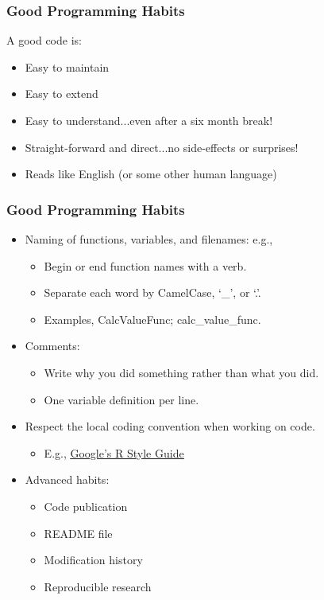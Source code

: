 \documentclass[aspectratio=169, 12pt]{beamer}
\begin{document}
	\begin{frame}
	\frametitle{Good Programming Habits}
	A good code is:
	\begin{itemize}
	\item Easy to maintain
	\item Easy to extend
	\item Easy to understand...even after a six month break!
	\item Straight-forward and direct...no side-effects or surprises!
	\item Reads like English (or some other human language)
	\end{itemize}

	\end{frame}

	\begin{frame}
	\frametitle{Good Programming Habits}
	\begin{itemize}
	\item Naming of functions, variables, and filenames: e.g., 
	\begin{itemize}
	\item Begin or end function names with a verb.
	\item Separate each word by CamelCase, `\_', or `.'.
	\item Examples, CalcValueFunc; calc\_value\_func.
	\end{itemize}
	\item Comments: 
	\begin{itemize}
	\item Write why you did something rather than what you did.
	\item One variable definition per line.
	\end{itemize} 
	\item Respect the local coding convention when working on code.
	\begin{itemize}
	\item E.g., \href{https://google.github.io/styleguide/Rguide.html}{\underline{Google’s R Style Guide}}
	\end{itemize}
	\item Advanced habits:
	\begin{itemize}
	\item Code publication
	\item README file
	\item Modification history
	\item Reproducible research

	\end{itemize}
	\end{itemize}

	\end{frame}
\end{document}
